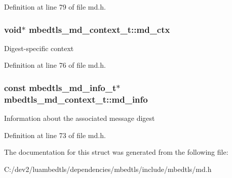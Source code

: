 Definition at line 79 of file md.\-h.

\hypertarget{structmbedtls__md__context__t_af7dc1e93cbd6f9a3c52d1a5064732fe1}{
\subsubsection[{md\-\_\-ctx}]{\setlength{\rightskip}{0pt plus 5cm}void$\ast$ mbedtls\-\_\-md\-\_\-context\-\_\-t\-::md\-\_\-ctx}}\label{structmbedtls__md__context__t_af7dc1e93cbd6f9a3c52d1a5064732fe1}
Digest-\/specific context 

Definition at line 76 of file md.\-h.

\hypertarget{structmbedtls__md__context__t_a946ec8104697a039cf1990233cd41b28}{
\subsubsection[{md\-\_\-info}]{\setlength{\rightskip}{0pt plus 5cm}const {\bf mbedtls\-\_\-md\-\_\-info\-\_\-t}$\ast$ mbedtls\-\_\-md\-\_\-context\-\_\-t\-::md\-\_\-info}}\label{structmbedtls__md__context__t_a946ec8104697a039cf1990233cd41b28}
Information about the associated message digest 

Definition at line 73 of file md.\-h.



The documentation for this struct was generated from the following file\-:\begin{DoxyCompactItemize}
\item 
C\-:/dev2/luambedtls/dependencies/mbedtls/include/mbedtls/md.\-h\end{DoxyCompactItemize}
